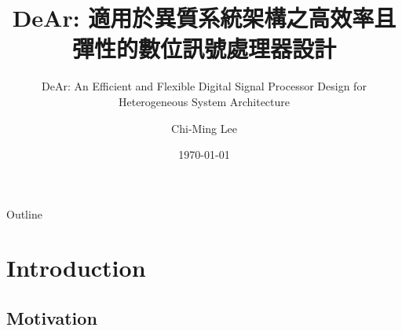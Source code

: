 \documentclass{beamer}
\author{ 
    Chi-Ming Lee
}
\institute[NTHU EE] %
{
    Department of Electrial Engineering\\
    National Tsing Hua University
}
\date{\today}
\begin{document}
\begin{CJK}{UTF8}{bkai}

    \title[DeAr DSP]{ DeAr: 適用於異質系統架構之高效率且彈性的數位訊號處理器設計}
    \subtitle{DeAr: An Efficient and Flexible Digital Signal Processor Design for Heterogeneous System Architecture}

    \begin{frame}
        \titlepage
    \end{frame}

    \begin{frame}{Outline}
        \tableofcontents
    \end{frame}


    \section{Introduction}

    \subsection{Motivation}


\end{CJK}
\end{document}
